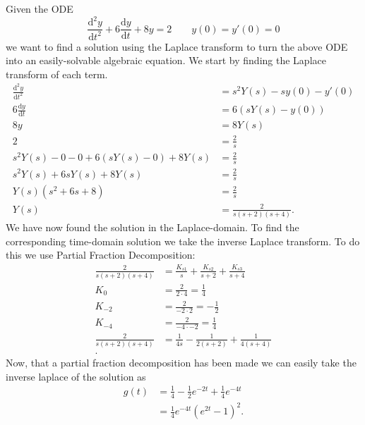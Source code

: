 \begin{exa}
  Given the ODE
  \begin{equation*}
    \frac{\mathrm{d}^2 y}{\mathrm{d}t^2} + 6 \frac{\mathrm{d}y}{\mathrm{d}t} + 8y = 2 \qquad y(0)=y'(0)=0
  \end{equation*}
  we want to find a solution using the Laplace transform to turn the above ODE into an easily-solvable algebraic equation.
  \tcblower
  We start by finding the Laplace transform of each term.
  \begin{align*}
    \frac{\mathrm{d}^2y}{\mathrm{d}t^2} &= s^2 Y(s) - sy(0) - y'(0) \\
    6 \frac{\mathrm{d}y}{\mathrm{d}t} &= 6 \left( sY(s) - y(0) \right) \\
    8y &= 8Y(s) \\
    2 &= \frac{2}{s} \\
    s^2 Y(s) - 0 - 0 + 6 \left( sY(s) - 0 \right) + 8Y(s) &= \frac{2}{s} \\
    s^2 Y(s) + 6sY(s) + 8Y(s) &= \frac{2}{s} \\
    Y(s) \left( s^2 + 6s + 8 \right) &= \frac{2}{s} \\
    Y(s) &= \frac{2}{s \left( s+2 \right) \left( s+4 \right)}
  .\end{align*}
  We have now found the solution in the Laplace-domain.
  To find the corresponding time-domain solution we take the inverse Laplace transform.
  To do this we use Partial Fraction Decomposition:
  \begin{align*}
    \frac{2}{s \left( s+2 \right) \left( s+4 \right)} &= \frac{K_{s 1}}{s} + \frac{K_{s 2}}{s + 2} + \frac{K_{s 3}}{s + 4}\\
    K_{0} &= \frac{2}{2 \cdot 4} = \frac{1}{4} \\
    K_{-2} &= \frac{2}{-2 \cdot 2} = - \frac{1}{2} \\
    K_{-4} &= \frac{2}{-4 \cdot -2} = \frac{1}{4} \\
    \frac{2}{s (s+2)(s+4)} &= \frac{1}{4 s} - \frac{1}{2(s + 2)} + \frac{1}{4(s + 4)}\\
  .\end{align*}
  Now, that a partial fraction decomposition has been made we can easily take the inverse laplace of the solution as
  \begin{align*}
    g(t) &= \frac{1}{4} - \frac{1}{2} e^{-2t} + \frac{1}{4} e^{-4t} \\
     &= \frac{1}{4} e^{-4 t} \left(e^{2 t}-1\right)^2
  .\end{align*}
\end{exa}


